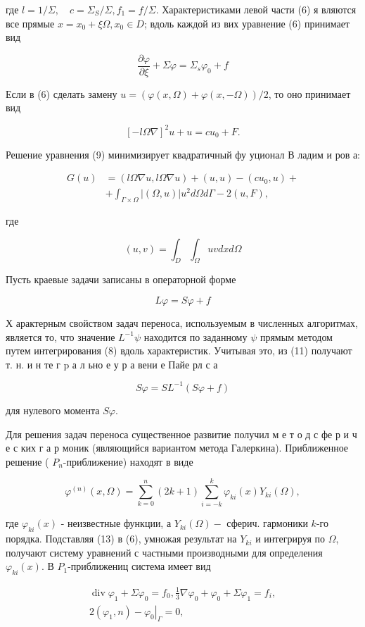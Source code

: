 \documentclass[10pt]{article}
\begin{document}
где $l=1 / \Sigma, \quad c=\Sigma_{S} / \Sigma, f_{1}=f / \Sigma$. Характеристиками левой части (6) я вляются все прямые $x=x_{0}+\xi \Omega, x_{0} \in D$; вдоль каждой из вих уравнение (6) принимает вид

\[
\frac{\partial \varphi}{\partial \xi}+\Sigma \varphi=\Sigma_{s} \varphi_{0}+f
\]

Если в (6) сделать замену $u=(\varphi(x, \Omega)+\varphi(x,-\Omega)) / 2$, то оно принимает вид

\[
[-l \Omega \nabla]^{2} u+u=c u_{0}+F .
\]

Решение уравнения (9) минимизирует квадратичный фу уционал В ладим и ров а:

\[
\begin{aligned}
G(u) & =(l \Omega \nabla u, l \Omega \nabla u)+(u, u)-\left(c u_{0}, u\right)+ \\
& +\int_{\Gamma \times \Omega}|(\Omega, u)| u^{2} d \Omega d \Gamma-2(u, F),
\end{aligned}
\]

где

\[
(u, v)=\int_{D} \int_{\Omega} u v d x d \Omega
\]

Пусть краевые задачи записаны в операторной форме

\[
L \varphi=S \varphi+f
\]

Х арактерным свойством задач переноса, используемым в численных алгоритмах, является то, что значение $L^{-1} \psi$ находится по заданному $\psi$ прямым методом путем интегрирования (8) вдоль характеристик. Учитывая это, из (11) получают т. н. и н те г p а л ьно е у р а вени е Пайе рл с а

\[
S \varphi=S L^{-1}(S \varphi+f)
\]

для нулевого момента $S \varphi$.

Для решения задач переноса существенное развитие получил м е т о д с фе р и ч е с ких г а р моник (являющийся вариантом метода Галеркина). Приближенное решение ( $P_{n}$-приближение) находят в виде

\[
\varphi^{(n)}(x, \Omega)=\sum_{k=0}^{n}(2 k+1) \sum_{i=-k}^{k} \varphi_{k i}(x) Y_{k i}(\Omega),
\]

где $\varphi_{k i}(x)$ - неизвестные функции, а $Y_{k i}(\Omega)-$ сферич. гармоники $k$-го порядка. Подставляя (13) в (6), умножая результат на $Y_{k i}$ и интегрируя по $\Omega$, получают систему уравнений с частными производными для определения $\varphi_{k i}(x)$. В $P_{1}$-приближениц система имеет вид

\[
\begin{gathered}
\operatorname{div} \varphi_{1}+\Sigma \varphi_{0}=f_{0}, \frac{1}{3} \nabla \varphi_{0}+\varphi_{0}+\Sigma \varphi_{1}=f_{i}, \\
2\left(\varphi_{1}, n\right)-\left.\varphi_{0}\right|_{\Gamma}=0,
\end{gathered}
\]
\end{document}
